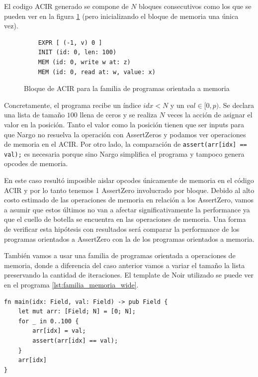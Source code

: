 \documentclass[11pt,a4paper]{tesis}
\begin{document}
El codigo ACIR generado se compone de $N$ bloques consecutivos como los que se pueden ver en la figura \ref{fig:ACIR_familia_memoria} (pero inicializando el bloque de memoria una única vez).

\begin{figure}[H]
    \centering
    \begin{verbatim}
    EXPR [ (-1, v) 0 ]
    INIT (id: 0, len: 100) 
    MEM (id: 0, write w at: z) 
    MEM (id: 0, read at: w, value: x)
    \end{verbatim}
    \caption{Bloque de ACIR para la familia de programas orientada a memoria}
    \label{fig:ACIR_familia_memoria}
\end{figure}

Concretamente, el programa recibe un índice $idx < N$ y un $val \in [0,p)$. Se declara una lista de tamaño $100$ llena de ceros y se realiza $N$ veces la acción de asignar el valor en la posición. Tanto el valor como la posición tienen que ser inputs para que Nargo no resuelva la operación con AssertZeros y podamos ver operaciones de memoria en el ACIR. Por otro lado, la comparación de \texttt{assert(arr[idx] == val);} es necesaria porque sino Nargo simplifica el programa y tampoco genera opcodes de memoria. 

En este caso resultó imposible aislar opcodes únicamente de memoria en el código ACIR y por lo tanto tenemos 1 AssertZero involucrado por bloque. Debido al alto costo estimado de las operaciones de memoria en relación a los AssertZero, vamos a asumir que estos últimos no van a afectar significativamente la performance ya que el cuello de botella se encuentra en las operaciones de memoria. Una forma de verificar esta hipótesis con resultados será comparar la performance de los programas orientados a AssertZero con la de los programas orientados a memoria. 

También vamos a usar una familia de programas orientada a operaciones de memoria, donde a diferencia del caso anterior vamos a variar el tamaño la lista preservando la cantidad de iteraciones. El template de Noir utilizado se puede ver en el programa \ref{lst:familia_memoria_wide}.

\begin{listing}[H]
\caption{Familia de programas orientada a operaciones de memoria, variando tamaño de la lista}
\label{lst:familia_memoria_wide}
\begin{verbatim}
fn main(idx: Field, val: Field) -> pub Field {
    let mut arr: [Field; N] = [0; N];
    for _ in 0..100 {
        arr[idx] = val;
        assert(arr[idx] == val);
    }
    arr[idx]
}
\end{verbatim}
\end{listing}
\end{document}
